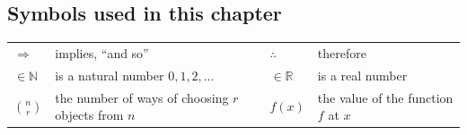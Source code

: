\documentclass[11pt]{article}
\begin{document}
\subsection*{Symbols used in this chapter}

\begin{tabular}{@{}p{1.5cm}p{6.2cm}p{1.5cm}p{6.2cm}@{}}
$\Rightarrow$ & implies, ``and so'' & $\therefore$ & therefore\\
$\in \mathbb{N}$ & is a natural number $0,1,2,\dots$ & $\in \mathbb{R}$ & is a real number\\
$\binom nr$ & the number of ways of choosing $r$ objects from $n$ & $f(x)$ & the value of the function $f$ at $x$\\
\end{tabular}
\end{document}
